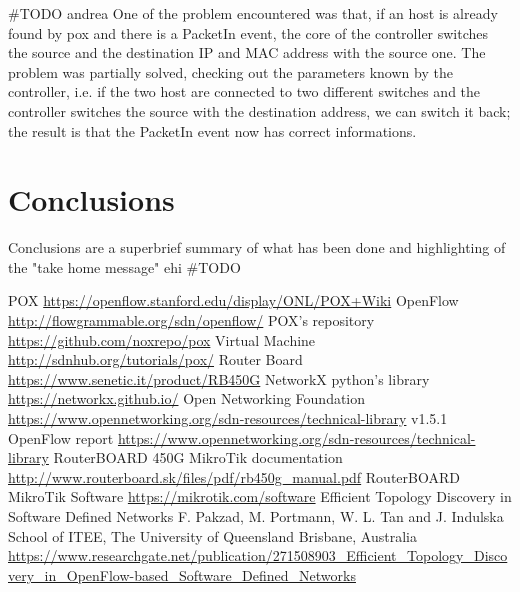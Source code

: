 \documentclass[conference,10pt]{IEEEtran}
\begin{document}
  \#TODO andrea
	One of the problem encountered was that, if an host is already found by pox and there is a PacketIn event, the core of the controller
	switches the source and the destination IP and MAC address with the source one. The problem was partially solved, checking out the
	parameters known by the controller, i.e. if the two host are connected to two different switches and the controller switches the source with the
	destination address, we can switch it back; the result is that the PacketIn event now has correct informations.

\section{Conclusions}\label{sec:conclusion}
Conclusions are a superbrief summary of what has been done and highlighting of the "take home message"
ehi
\#TODO


\begin{thebibliography}{99}
	 POX \url{https://openflow.stanford.edu/display/ONL/POX+Wiki}
	 OpenFlow \url{http://flowgrammable.org/sdn/openflow/}
	 POX's repository \url{https://github.com/noxrepo/pox}
	 Virtual Machine \url{http://sdnhub.org/tutorials/pox/}
	 Router Board \url{https://www.senetic.it/product/RB450G}
	 NetworkX python's library \url{https://networkx.github.io/}
	 Open Networking Foundation \url{https://www.opennetworking.org/sdn-resources/technical-library}
	 v1.5.1 OpenFlow report \url{https://www.opennetworking.org/sdn-resources/technical-library}
	 RouterBOARD 450G MikroTik documentation \url{http://www.routerboard.sk/files/pdf/rb450g_manual.pdf}
	 RouterBOARD MikroTik Software \url{https://mikrotik.com/software}
	  Efficient Topology Discovery in Software Defined Networks F. Pakzad, M. Portmann, W. L. Tan and J. Indulska 
	School of ITEE, The University of Queensland Brisbane, Australia \url{https://www.researchgate.net/publication/271508903_Efficient_Topology_Discovery_in_OpenFlow-based_Software_Defined_Networks}
\end{thebibliography}
\end{document}
